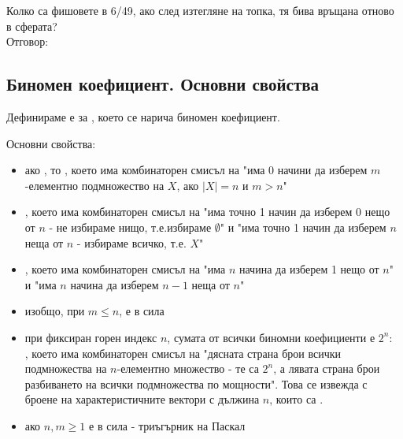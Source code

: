 \begin{example}
    Колко са фишовете в 6/49, ако след изтегляне на топка, тя бива връщана отново в сферата? \\
    Отговор: 
\end{example}

\subsection*{Биномен коефициент. Основни свойства}
Дефинираме е  
за , което се нарича биномен коефициент.

Основни свойства:
\begin{itemize}
    \item ако , то , което има комбинаторен смисъл на "има 0 начини 
    да изберем \(m\)-елементно подмножество на \(X\), ако \(|X| = n\) и \(m > n\)"
    \item {}, което има комбинаторен смисъл на "има точно 1 начин да 
    изберем 0 нещо от \(n\) - не избираме нищо, т.е.избираме \(\emptyset\)" и "има точно 1 начин да 
    изберем \(n\) неща от \(n\) - избираме всичко, т.е. \(X\)"
    \item {}, което има комбинаторен смисъл на "има \(n\) начина 
    да изберем 1 нещо от \(n\)" и "има \(n\) начина да изберем \(n - 1\) неща от \(n\)"
    \item изобщо, при \(m \le n\), е в сила 
    \item при фиксиран горен индекс \(n\), сумата от всички биномни коефициенти е \(2^n\): \\
    , което има 
    комбинаторен смисъл на "дясната страна брои всички подмножества на \(n\)-елементно множество - те са 
    \(2^n\), а лявата страна брои разбиването на всички подмножества по мощности". Това се извежда с броене 
    на характеристичните вектори с дължина \(n\), които са .
    \item ако \(n, m \ge 1\) е в сила  - 
    триъгърник на Паскал
\end{itemize}

